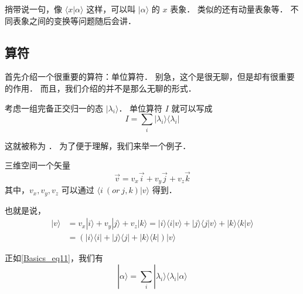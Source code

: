 捎带说一句，像 $\langle x|\alpha\rangle$ 这样，可以叫 $|\alpha \rangle$ 的 $x$ 表象． 类似的还有动量表象等． 不同表象之间的变换等问题随后会讲．

\subsection{算符}

首先介绍一个很重要的算符：单位算符． 别急，这个是很无聊，但是却有很重要的作用． 而且，我们介绍的并不是那么无聊的形式．

考虑一组完备正交归一的态 $|\lambda_i\rangle$． 单位算符 $I$ 就可以写成
\begin{equation}\label{Basics_eq11}
I = \sum_i |\lambda_i\rangle\langle\lambda_i|
\end{equation}

这就被称为 ． 为了便于理解，我们来举一个例子．

\begin{exam}{}
三维空间一个矢量
\begin{equation}
\vec{v} = v_x\vec{i} + v_y\vec{j} + v_z \vec{k} 
\end{equation}
其中，$v_x, v_y, v_z$ 可以通过 $\langle i\ (or\ j, k)|v\rangle$ 得到．

也就是说，
\begin{equation}
\begin{split}
|v\rangle &= v_x|i\rangle + v_y|j\rangle + v_z|k\rangle = |i\rangle\langle i|v\rangle + |j\rangle\langle j|v\rangle + |k\rangle\langle k|v\rangle\\ &= (|i\rangle\langle i|+|j\rangle\langle j|+|k\rangle\langle k|)|v\rangle
\end{split}
\end{equation}
\end{exam}{}
正如\autoref{Basics_eq11}，我们有
\begin{equation}
|\alpha\rangle = \sum_i |\lambda_i\rangle\langle\lambda_i|\alpha\rangle
\end{equation}

